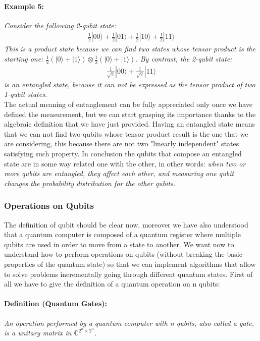 \documentclass[english]{article}
\begin{document}
				\paragraph{Example 5:} \emph{Consider the following 2-qubit state:
				\begin{align*}
					\frac{1}{2}|00\rangle+\frac{1}{2}|01\rangle+\frac{1}{2}|10\rangle+\frac{1}{2}|11\rangle
				\end{align*} 
				This is a product state because we can find two states whose tensor product is the starting one: $\frac{1}{2}(|0\rangle+|1\rangle)\otimes\frac{1}{2}(|0\rangle+|1\rangle)$. By contrast, the 2-qubit state:
				\begin{align*}
					\frac{1}{\sqrt{2}}|00\rangle+\frac{1}{\sqrt{2}}|11\rangle
				\end{align*}
				is an entangled state, because it can not be expressed as the tensor product of two 1-qubit states.} \\
			
				The actual meaning of entanglement can be fully appreciated only once we have defined the measurement, but we can start grasping its importance thanks to the algebraic definition that we have just provided. Having an entangled state means that we can not find two qubits whose tensor product result is the one that we are considering, this because there are not two "linearly independent" states satisfying such property. In conclusion the qubits that compose an entangled state are in some way related one with the other, in other words: \emph{when two or more qubits are entangled, they affect each other, and measuring one qubit changes the probability distribution for the other qubits.}
				
			\subsubsection{Operations on Qubits}
			\label{sec:operationsOnQubits}
				The definition of qubit should be clear now, moreover we have also understood that a quantum computer is composed of a quantum register where multiple qubits are used in order to move from a state to another. We want now to understand how to perform operations on qubits (without breaking the basic properties of the quantum state) so that we can implement algorithms that allow to solve problems incrementally going through different quantum states. First of all we have to give the definition of a quantum operation on n qubits:
				
				\paragraph{Definition (Quantum Gates):} \emph{An operation performed by a quantum computer with n qubits, also called a gate, is a unitary matrix in $\mathbb{C}^{2^{n}\times2^{n}}$.} \\
				
\end{document}

